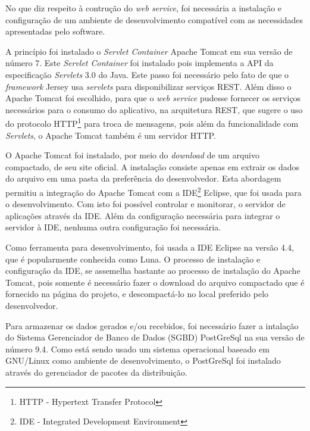 	
	\par No que diz respeito à contrução do \textit{web service}, foi necessária a
instalação e configuração de um ambiente de desenvolvimento compatível com as
necessidades apresentadas pelo software.

	\par A princípio foi instalado o \textit{Servlet Container} Apache Tomcat em
sua versão de número {7}. Este \textit{Servlet Container} foi instalado pois
implementa a API da especificação \textit{Servlets} {3.0} do Java. Este passo
foi necessário pelo fato de que o \textit{framework} Jersey usa
\textit{servlets} para disponibilizar serviços REST. Além disso o Apache Tomcat
foi escolhido, para que o \textit{web service} pudesse fornecer os serviços
necessários para o consumo do aplicativo, na arquitetura REST, que sugere o uso
do protocolo HTTP\footnote{HTTP - Hypertext Transfer Protocol} para troca de
mensagens, pois além da funcionalidade com \textit{Servlets}, o Apache Tomcat
também é um servidor HTTP.
	
	\par O Apache Tomcat foi instalado, por meio do \textit{download} de um
arquivo compactado, de seu site oficial. A instalação consiste apenas
em extrair os dados do arquivo em uma pasta da preferência do desenvolvedor.
Esta abordagem permitiu a integração do Apache Tomcat com a
IDE\footnote{IDE - Integrated Development Environment}
Eclipse, que foi usada para o desenvolvimento. Com isto foi possível controlar
e monitorar, o servidor de aplicações através da IDE. Além da configuração
necessária para integrar o servidor à IDE, nenhuma outra configuração foi
necessária.

	\par Como ferramenta para desenvolvimento, foi usada a IDE Eclipse na versão
{4.4}, que é popularmente conhecida como Luna. O processo de instalação e
configuração da IDE, se assemelha bastante ao processo de instalação do Apache
Tomcat, pois somente é necessário fazer o download do arquivo compactado que é
fornecido na página do projeto, e descompactá-lo no local preferido pelo
desenvolvedor.

	\par Para armazenar os dados gerados e/ou recebidos, foi necessário fazer a
intalação do Sistema Gerenciador de Banco de Dados (SGBD) PostGreSql na sua
versão de número {9.4}. Como está sendo usado um sistema operacional baseado em
GNU/Linux como ambiente de desenvolvimento, o PostGreSql foi instalado através
do gerenciador de pacotes da distribuição.
 

